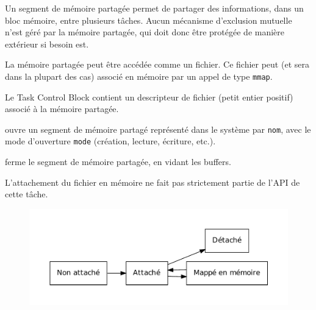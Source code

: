 {
Un segment de mémoire partagée permet de partager des informations, dans un
bloc mémoire, entre plusieurs tâches. Aucun mécanisme d'exclusion mutuelle
n'est géré par la mémoire partagée, qui doit donc être protégée de
manière extérieur si besoin est.

La mémoire partagée peut être accédée comme un fichier. Ce fichier peut (et
sera dans la plupart des cas) associé en mémoire par un appel de type
\texttt{mmap}.

Le Task Control Block contient un descripteur de fichier (petit entier
positif) associé à la mémoire partagée.
}
{}
{
    \begin{description}
	\item[\texttt{int mempart\_init(nom, mode)} : ] ouvre un segment de
	    mémoire partagé représenté dans le système par \texttt{nom}, avec le
	    mode d'ouverture \texttt{mode} (création, lecture, écriture, etc.).
	\item[\texttt{int mempart\_fermer(fd)} : ] ferme le segment de mémoire
	partagée, en vidant les buffers.
	\item L'attachement du fichier en mémoire ne fait pas strictement
	partie de l'API de cette tâche.
    \end{description}
}
{
\begin{figure} [htp]
\centering
\includegraphics[width=\textwidth]{img/etatMemoirePartagee.pdf}
\end{figure}
}
{}
